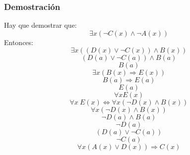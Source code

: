 \documentclass[letterpaper,10pt]{article}
\begin{document}
\subsubsection{Demostraci\'on}
\begin{minipage}[c]{0.4\textwidth}
    Hay que demostrar que:
    \begin{equation*}
        \exists x (  \neg C(x) \wedge \neg A(x))
    \end{equation*}
    Entonces:
    \begin{equation*}
        \exists x ((D(x) \vee \neg C(x)) \wedge B(x))
    \end{equation*}
    \begin{equation*}
        (D(a) \vee \neg C(a)) \wedge B(a)
    \end{equation*}
    \begin{equation*}
       B(a)
    \end{equation*}
    \begin{equation*}
        \exists x (B(x) \Rightarrow E(x))
    \end{equation*}
    \begin{equation*}
        B(a) \Rightarrow E(a)
    \end{equation*}
    \begin{equation*}
       E(a)
    \end{equation*}
    \begin{equation*}
       \forall x E(x)
    \end{equation*}
    \begin{equation*}
       \forall x \  E(x) \Leftrightarrow \forall x(\neg D(x) \wedge B(x))
    \end{equation*}
    \begin{equation*}
        \forall x(\neg D(x) \wedge B(x))
    \end{equation*}
    \begin{equation*}
        \neg D(a) \wedge B(a)
     \end{equation*}
     \begin{equation*}
        \neg D(a)
     \end{equation*}
     \begin{equation*}
        (D(a) \vee \neg C(a))
     \end{equation*}
     \begin{equation*}
        \neg C(a)
     \end{equation*}
     \begin{equation*}
       \forall x (A(x) \vee D(x)) \Rightarrow C(x)

\end{equation*}
\end{minipage}
\end{document}
